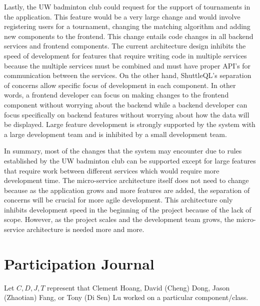 \documentclass{article}
\begin{document}
Lastly, the UW badminton club could request for the support of tournaments in the application. This feature would be a very large change and would involve registering users for a tournament, changing the matching algorithm and adding new components to the frontend. This change entails code changes in all backend services and frontend components. The current architecture design inhibits the speed of development for features that require writing code in multiple services because the multiple services must be combined and must have proper API’s for communication between the services. On the other hand, ShuttleQL’s separation of concerns allow specific focus of development in each component. In other words, a frontend developer can focus on making changes to the frontend component without worrying about the backend while a backend developer can focus specifically on backend features without worrying about how the data will be displayed. Large feature development is strongly supported by the system with a large development team and is inhibited by a small development team.

In summary, most of the changes that the system may encounter due to rules established by the UW badminton club can be supported except for large features that require work between different services which would require more development time. The micro-service architecture itself does not need to change because as the application grows and more features are added, the separation of concerns will be crucial for more agile development. This architecture only inhibits development speed in the beginning of the project because of the lack of scope. However, as the project scales and the development team grows, the micro-service architecture is needed more and more.


\newpage
\section{Participation Journal}
Let $C,D,J,T$ represent that Clement Hoang, David (Cheng) Dong, Jason (Zhaotian) Fang, or Tony (Di Sen) Lu worked on a particular component/class.
\end{document}
